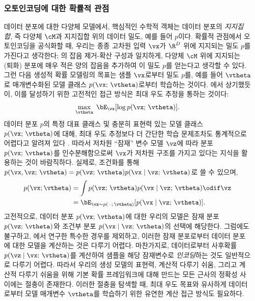\documentclass[../../book-main_ko.tex]{subfiles}
\begin{document}
\subsubsection{오토인코딩에 대한 확률적 관점}
데이터 분포에 대한 다양체 모델에서, 핵심적인 수학적 객체는 데이터 분포의 \textit{지지집합}, 즉 다양체 $\cM$과 지지집합 위의 데이터 밀도, 예를 들어 $p$이다. 확률적 관점에서 오토인코딩을 공식화할 때, 우리는 종종 고차원 입력 $\vx$가 $\R^D$ 위에 지지되는 밀도 $p$를 가진다고 생각한다; 의 잡음 제거-확산 구성과 일치하게, 다양체 $\cM$ 위에 지지되는 (퇴화) 분포에 매우 적은 양의 잡음을 추가하여 이 밀도 $p$를 얻는다고 생각할 수 있다.
그런 다음 생성적 확률 모델링의 목표는 샘플 $\vx$로부터 밀도 $p$를, 예를 들어 $\vtheta$로 매개변수화된 모델 클래스 $p(\vx;\, \vtheta)$로부터 학습하는 것이다. 에서 상기했듯이, 이를 달성하기 위한 고전적인 접근 방식은 최대 우도 추정을 통하는 것이다:
\begin{equation*}\label{eq:VAE-MLE}
\max_{\vtheta}\; \bE_{\vx}[ \log p(\vx;\, \vtheta) ].
\end{equation*}
데이터 분포 $p$의 특정 대표 클래스 및 충분히 표현력 있는 모델 클래스 $p(\vx;\, \vtheta)$에 대해, 최대 우도 추정보다 더 간단한 학습 문제조차도 통계적으로 어렵다고 알려져 있다 \cite{Yang1999-wb}. 따라서 저차원 ``잠재'' 변수 모델 $\vz$에 따라 분포 $p(\vx ;\, \vtheta)$를 인수분해함으로써 $\vx$가 저차원 구조를 가지고 있다는 지식을 활용하는 것이 바람직하다. 실제로, 조건화를 통해 $p(\vx, \vz ;\, \vtheta) = p(\vz;\, \vtheta) p(\vx \mid \vz;\, \vtheta)$로 쓸 수 있으며,
\begin{align*}
p(\vx; \vtheta) &= \int p(\vz;\, \vtheta) p(\vx \mid \vz;\, \vtheta) \odif \vz
\\
&= 
\bE_{\vz \sim p(\,\cdot\,;\, \vtheta)}[ p(\vx \mid \vz;\, \vtheta) ].
\end{align*}
고전적으로, 데이터 분포 $p(\vx;\, \vtheta)$에 대한 우리의 모델은 잠재 분포 $p(\vz;\, \vtheta)$와 조건부 분포 $p(\vx \mid \vz;\, \vtheta)$의 선택에 해당한다.
그럼에도 불구하고, 에서 연구한 특수한 경우를 제외하고, 이러한 잠재 분포로부터 데이터 분포에 대한 모델을 계산하는 것은 다루기 어렵다.
마찬가지로, 데이터로부터 사후확률 $p(\vz \mid \vx;\, \vtheta)$를 계산하여 샘플을 해당 잠재변수로 \textit{인코딩}하는 것도 일반적으로 다루기 어렵다.
따라서 우리의 생성 모델의 표현력, 계산적 다루기 쉬움, 그리고 계산적 다루기 쉬움을 위해 기본 확률 프레임워크에 대해 만드는 모든 근사의 정확성 사이에는 절충이 존재한다.
이러한 절충을 탐색할 때, 최대 우도 목표와 유사하게 데이터로부터 모델 매개변수 $\vtheta$를 학습하기 위한 유연한 계산 접근 방식도 필요하다.
\end{document}
